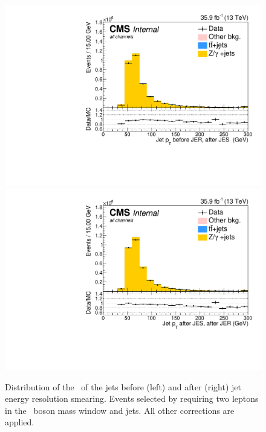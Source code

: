 \begin{figure}[htbp]
	\centering
	\includegraphics[width=0.49\linewidth]{5_Eventselection/Figures/Reweighing/2lepcontrol_dilep_JetPt_bfJER_all_Stack}
	\includegraphics[width=0.49\linewidth]{5_Eventselection/Figures/Reweighing/2lepcontrol_dilep_JetPt_afJER_all_Stack}
	\caption{Distribution of the \pt\ of the jets before (left) and after (right) jet energy resolution smearing. Events selected by requiring two leptons in the \PZ\ boson mass window and jets. All other corrections are applied.}
	\label{fig:jerSF}
\end{figure}



